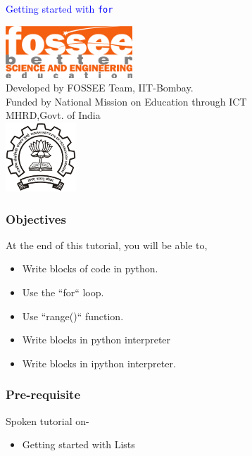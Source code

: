 \documentclass[presentation]{beamer}
\title{}
\author{FOSSEE}
\date{}
\begin{document}
\begin{frame}

\begin{center}
\vspace{12pt}
\textcolor{blue}{\huge Getting started with \texttt{for}}
\end{center}
\vspace{18pt}
\begin{center}
\vspace{10pt}
\includegraphics[scale=0.95]{../images/fossee-logo.png}\\
\vspace{5pt}
\scriptsize Developed by FOSSEE Team, IIT-Bombay. \\ 
\scriptsize Funded by National Mission on Education through ICT\\
\scriptsize  MHRD,Govt. of India\\
\includegraphics[scale=0.30]{../images/iitb-logo.png}\\
\end{center}
\end{frame}
\begin{frame}
\frametitle{Objectives}
\label{sec-2}

  At the end of this tutorial, you will be able to, 

\begin{itemize}
\item Write blocks of code in python.
\item Use the ``for`` loop.
\item Use ``range()`` function.
\item Write blocks in python interpreter
\item Write blocks in ipython interpreter.
\end{itemize}
\end{frame}
\begin{frame}
\frametitle{Pre-requisite}
\label{sec-3}

  Spoken tutorial on-

\begin{itemize}
\item Getting started with Lists
\end{itemize}
\end{frame}
\end{document}
